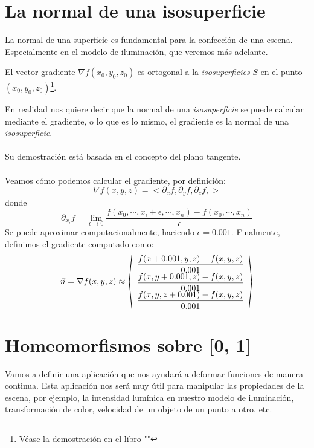 \section{La normal de una isosuperficie}

La normal de una superficie es fundamental para la confección de una escena. Especialmente en el modelo de iluminación, que veremos más adelante.

\begin{theorem}
	El vector gradiente \(\nabla f(x_0, y_0, z_0)\)  es ortogonal a la \textit{isosuperficies} \(S\) en el punto \((x_0, y_0, z_0)\)\footnote{Véase la demostración en el libro ""}.
\end{theorem}
En realidad nos quiere decir que la normal de una \textit{isosuperficie} se puede calcular mediante el gradiente, o lo que es lo mismo, el gradiente es la normal de una \textit{isosuperficie}.\\\\
Su demostración está basada en el concepto del plano tangente.\\\\
Veamos cómo podemos calcular el gradiente, por definición:
\[ \nabla f(x, y, z)= < \partial_x f, \partial_y f, \partial_z f, > \]
donde 
\[ \partial_{x_i}f=\lim_{\epsilon\longrightarrow 0}\dfrac{f(x_0,\cdots,x_i+\epsilon,\cdots,x_n)-f(x_0, \cdots, x_n)}{\epsilon} \]
Se puede aproximar computacionalmente, haciendo \(\epsilon = 0.001\).
Finalmente, definimos el gradiente computado como:
\[
\Vec{n}=\nabla f(x, y, z)\approx
\stretchleftright[1000]{\langle}
{\begin{array}{c}
\dfrac{f(x+0.001,y,z)-f(x,y,z)}{0.001}\\
\dfrac{f(x,y+0.001,z)-f(x,y,z)}{0.001}\\
\dfrac{f(x,y,z+0.001)-f(x,y,z)}{0.001} \end{array}}
{\rangle}
\]

\section{Homeomorfismos sobre [0, 1]}

Vamos a definir una aplicación que nos ayudará a deformar funciones de manera continua. Esta aplicación nos será muy útil para manipular las propiedades de la escena, por ejemplo, la intensidad lumínica en nuestro modelo de iluminación, transformación de color, velocidad de un objeto de un punto a otro, etc.

